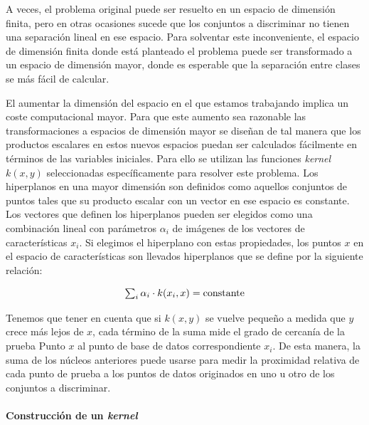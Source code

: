 \documentclass[12pt,spanish,a4paper]{article}
\let\oldparagraph\paragraph
\renewcommand{\paragraph}[1]{\oldparagraph{#1}\mbox{}}
\numberwithin{equation}{section}
\begin{document}
A veces, el problema original puede ser resuelto en un espacio de
dimensión finita, pero en otras ocasiones sucede que los conjuntos a
discriminar no tienen una separación lineal en ese espacio. Para
solventar este inconveniente, el espacio de dimensión finita donde está
planteado el problema puede ser transformado a un espacio de dimensión
mayor, donde es esperable que la separación entre clases se más fácil de
calcular.

El aumentar la dimensión del espacio en el que estamos trabajando
implica un coste computacional mayor. Para que este aumento sea
razonable las transformaciones a espacios de dimensión mayor se diseñan
de tal manera que los productos escalares en estos nuevos espacios
puedan ser calculados fácilmente en términos de las variables iniciales.
Para ello se utilizan las funciones \emph{kernel}
\({\displaystyle k(x,y)}\) seleccionadas específicamente para resolver
este problema. Los hiperplanos en una mayor dimensión son definidos como
aquellos conjuntos de puntos tales que su producto escalar con un vector
en ese espacio es constante. Los vectores que definen los hiperplanos
pueden ser elegidos como una combinación lineal con parámetros
\({\displaystyle \alpha_{i}}\) de imágenes de los vectores de
características \({\displaystyle x_{i}}\). Si elegimos el hiperplano con
estas propiedades, los puntos \({\displaystyle x}\) en el espacio de
características son llevados hiperplanos que se define por la siguiente
relación:

\begin{equation}
{\displaystyle \textstyle \sum_{i}\alpha_{i}\cdot k(x_{i},x) = \mathrm {constante}}
\end{equation}

Tenemos que tener en cuenta que si \({\displaystyle k(x,y)}\) se vuelve
pequeño a medida que \({\displaystyle y}\) crece más lejos de
\({\displaystyle x}\), cada término de la suma mide el grado de cercanía
de la prueba Punto \({\displaystyle x}\) al punto de base de datos
correspondiente \({\displaystyle x_ {i}}\). De esta manera, la suma de
los núcleos anteriores puede usarse para medir la proximidad relativa de
cada punto de prueba a los puntos de datos originados en uno u otro de
los conjuntos a discriminar.

\paragraph{\texorpdfstring{Construcción de un
\emph{kernel}}{Construcción de un kernel}}\label{construccion-de-un-kernel}
\end{document}
